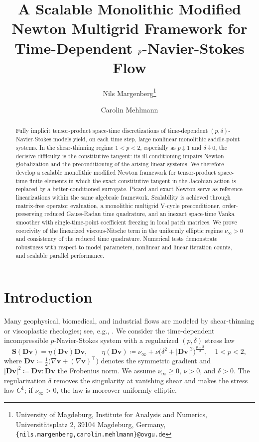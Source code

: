 \documentclass[DIV=16]{scrartcl}
\title{}
\date{}
\author{Nils Margenberg\thanks{
    University of Magdeburg,
    Institute for Analysis and Numerics,
    Universit\"atsplatz 2,
    39104 Magdeburg,
    Germany,
    \texttt{\{nils.margenberg,carolin.mehlmann\}@ovgu.de}
  }
  \and Carolin Mehlmann\footnotemark[1]
}
\title{A Scalable Monolithic Modified Newton Multigrid Framework for Time-Dependent \texorpdfstring{$\pn$}{p}-Navier-Stokes Flow}
\newcommand{\abs}[1]{\left\lvert #1\right\rvert}
\newcommand{\uu}{\boldsymbol v}
\newcommand{\GG}{\nabla}
\newcommand{\DD}{\boldsymbol D} %
\newcommand{\Sstress}{\boldsymbol S} %
\newcommand{\reg}{\delta}
\newcommand{\pn}{p}
\newcommand{\etaeff}[1]{\eta \left(#1\right)}
\begin{document}
\maketitle
\vspace*{-8ex}
\begin{abstract}
  Fully implicit tensor-product space-time discretizations of time-dependent
  $(\pn,\reg)$-Navier-Stokes models yield, on each time step, large nonlinear
  monolithic saddle-point systems. In the shear-thinning regime $1<\pn<2$,
  especially as $\pn\downarrow 1$ and $\reg\downarrow 0$, the decisive
  difficulty is the constitutive tangent: its ill-conditioning impairs Newton
  globalization and the preconditioning of the arising linear systems. We
  therefore develop a scalable monolithic modified Newton framework for
  tensor-product space-time finite elements in which the exact constitutive
  tangent in the Jacobian action is replaced by a better-conditioned surrogate.
  Picard and exact Newton serve as reference linearizations within the same
  algebraic framework. Scalability is achieved through matrix-free operator
  evaluation, a monolithic multigrid V-cycle preconditioner, order-preserving
  reduced Gauss-Radau time quadrature, and an inexact space-time Vanka smoother
  with single-time-point coefficient freezing in local patch matrices. We
  prove coercivity of the linearized viscous-Nitsche term in the uniformly
  elliptic regime $\nu_\infty>0$ and consistency of the reduced time quadrature.
  Numerical tests demonstrate robustness with respect to model parameters,
  nonlinear and linear iteration counts, and scalable parallel performance.
\end{abstract}

\section{Introduction}
\label{sec:intro}
Many geophysical, biomedical, and industrial flows are modeled by shear-thinning
or viscoplastic rheologies; see, e.g.,
\cite{galdi_mathematical_2008,drzisga_stencil_2020,RudiShihStadler2020AdvancedNewton,schussnig_robust_2021,he_linear_2025}.
We consider the time-dependent incompressible $\pn$-Navier-Stokes system with a
regularized $(\pn,\reg)$ stress law
\begin{equation}\label{eq:constitutive-law}
  \Sstress (\DD\uu)
  =\etaeff{\DD\uu}\DD\uu,
  \qquad
  \etaeff{\DD\uu}
  \coloneq \nu_{\infty}+\nu\bigl(\reg^2+\abs{\DD\uu}^2\bigr)^{\frac{\pn-2}{2}},\quad 1<\pn< 2,
\end{equation}
where $\DD\uu\coloneq \tfrac12\bigl(\GG\uu+(\GG\uu)^\top\bigr)$ denotes the
symmetric gradient and $\abs{\DD\uu}^2\coloneq \DD\uu:\DD\uu$ the Frobenius
norm.
We assume $\nu_{\infty}\ge 0$, $\nu>0$, and $\reg>0$.
The regularization $\reg$ removes the singularity at vanishing shear and makes
the stress law $C^1$; if $\nu_\infty>0$, the law is moreover uniformly
elliptic.
\end{document}
